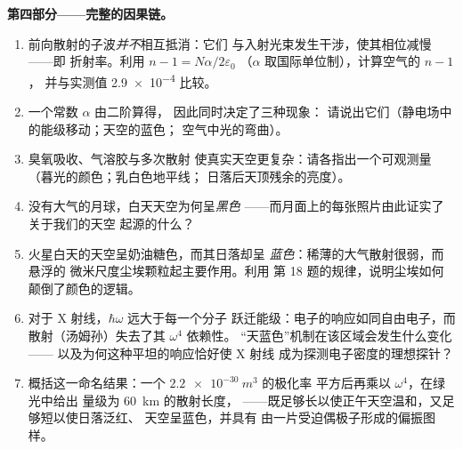 \begin{problem}
\medskip\noindent\textbf{第四部分——完整的因果链。}
\begin{enumerate}[resume]
  \item 前向散射的子波\emph{并不}相互抵消：它们
        与入射光束发生干涉，使其相位减慢——即
        折射率。利用 $n - 1 = N\alpha/2\varepsilon_0$
        （$\alpha$ 取国际单位制），计算空气的 $n - 1$，
        并与实测值 \num{2.9e-4} 比较。
  \item 一个常数 $\alpha$ 由二阶算得，
        因此同时决定了三种现象：
        请说出它们（静电场中的能级移动；天空的蓝色；
        空气中光的弯曲）。
  \item 臭氧吸收、气溶胶与多次散射
        使真实天空更复杂：请各指出一个可观测量
        （暮光的颜色；乳白色地平线；
        日落后天顶残余的亮度）。
  \item 没有大气的月球，白天天空为何呈\emph{黑色}
——而月面上的每张照片由此证实了关于我们的天空
        起源的什么？
  \item 火星白天的天空呈奶油糖色，而其日落却呈
        \emph{蓝色}：稀薄的大气散射很弱，而悬浮的
        微米尺度尘埃颗粒起主要作用。利用
        第 18 题的规律，说明尘埃如何颠倒了颜色的逻辑。
  \item 对于 X 射线，$\hbar\omega$ 远大于每一个分子
        跃迁能级：电子的响应如同自由电子，而
        散射（汤姆孙）失去了其 $\omega^4$ 依赖性。
        “天蓝色”机制在该区域会发生什么变化——
        以及为何这种平坦的响应恰好使 X 射线
        成为探测电子密度的理想探针？
  \item 概括这一命名结果：一个 $\qty{2.2e-30}{m^3}$ 的极化率
        平方后再乘以 $\omega^4$，在绿光中给出
        量级为 \qty{60}{km} 的散射长度，
——既足够长以使正午天空温和，又足够短以使日落泛红、
        天空呈蓝色，并具有
        由一片受迫偶极子形成的偏振图样。
\end{enumerate}
\end{problem}
